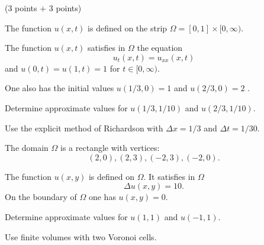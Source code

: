 (3 points + 3 points)
\begin{teilaufgaben}
\item
The function $u(x,t)$ is defined on the strip
$\Omega = [0,1] \times [0,\infty)$.

The function $u(x,t)$ satisfies in $\Omega$ the equation
\[
u_{t}(x,t) = u_{xx}(x,t)
\]
and $u(0,t) = u(1,t) = 1$ for $t \in [0,\infty)$.

One also has the initial values $u(1/3,0) = 1$ and $u(2/3,0) = 2$ .

Determine approximate values for $u(1/3,1/10)$ and $u(2/3,1/10)$.

Use the explicit method of Richardson with $\Delta x = 1/3$ and
$\Delta t = 1/30$.

\item
The domain $\Omega$ is a  rectangle with vertices:
\[
(2,0), (2,3), (-2,3), (-2,0). 
\]

The function $u(x,y)$ is defined on $\Omega$. It satisfies in $\Omega$ 
\[
\Delta u(x,y) = 10.
\]
On the boundary of $\Omega$ one has $u(x,y) = 0$. 

Determine approximate values for $u(1,1)$ and $u(-1,1)$. 

Use finite volumes with two Voronoi cells.  
\end{teilaufgaben}

